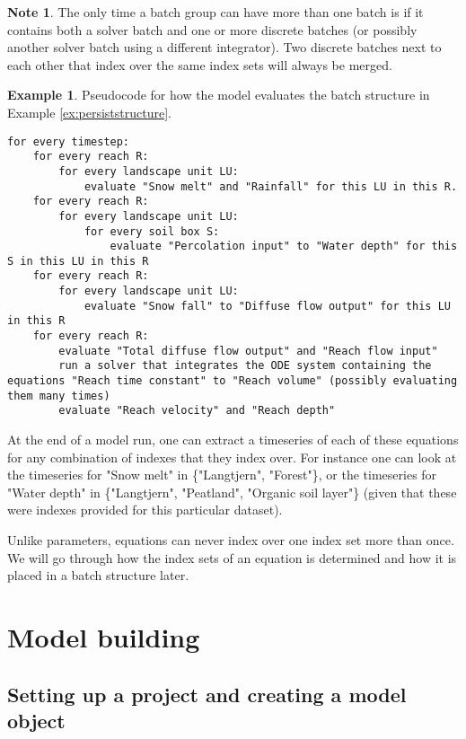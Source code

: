 \documentclass[11pt]{article}
\theoremstyle{definition}
\newtheorem{mynote}{Note}
\newenvironment{note}%
  {\begin{lrbox}{\notebox}%
   \begin{minipage}{\dimexpr\linewidth-2\fboxsep}
   \begin{mynote}}%
  {\end{mynote}%
   \end{minipage}%
   \end{lrbox}%
   \begin{trivlist}
     \item[]\colorbox{silver}{\usebox\notebox}
   \end{trivlist}}
\newtheorem{myexample}{Example}
\newenvironment{example}%
  {\begin{lrbox}{\examplebox}%
   \begin{minipage}{\dimexpr\linewidth-2\fboxsep}
   \begin{myexample}}%
  {\end{myexample}%
   \end{minipage}%
   \end{lrbox}%
   \begin{trivlist}
     \item[]\colorbox{silver}{\usebox\examplebox}
   \end{trivlist}}
\begin{document}
\begin{note}
The only time a batch group can have more than one batch is if it contains both a solver batch and one or more discrete batches (or possibly another solver batch using a different integrator). Two discrete batches next to each other that index over the same index sets will always be merged.
\end{note}

\begin{example}\label{ex:pseucocode}
Pseudocode for how the model evaluates the batch structure in Example \ref{ex:persiststructure}.
\begin{lstlisting}[style=textstyle]
for every timestep:
	for every reach R:
		for every landscape unit LU:
			evaluate "Snow melt" and "Rainfall" for this LU in this R.
	for every reach R:
		for every landscape unit LU:
			for every soil box S:
				evaluate "Percolation input" to "Water depth" for this S in this LU in this R
	for every reach R:
		for every landscape unit LU:
			evaluate "Snow fall" to "Diffuse flow output" for this LU in this R
	for every reach R:
		evaluate "Total diffuse flow output" and "Reach flow input"
		run a solver that integrates the ODE system containing the equations "Reach time constant" to "Reach volume" (possibly evaluating them many times)
		evaluate "Reach velocity" and "Reach depth"
\end{lstlisting}	
\end{example}

At the end of a model run, one can extract a timeseries of each of these equations for any combination of indexes that they index over. For instance one can look at the timeseries for "Snow melt" in \{"Langtjern", "Forest"\}, or the timeseries for "Water depth" in \{"Langtjern", "Peatland", "Organic soil layer"\} (given that these were indexes provided for this particular dataset).

Unlike parameters, equations can never index over one index set more than once. We will go through how the index sets of an equation is determined and how it is placed in a batch structure later.

\section{Model building}\label{sec:modelbuilding}

\subsection{Setting up a project and creating a model object}
\end{document}
